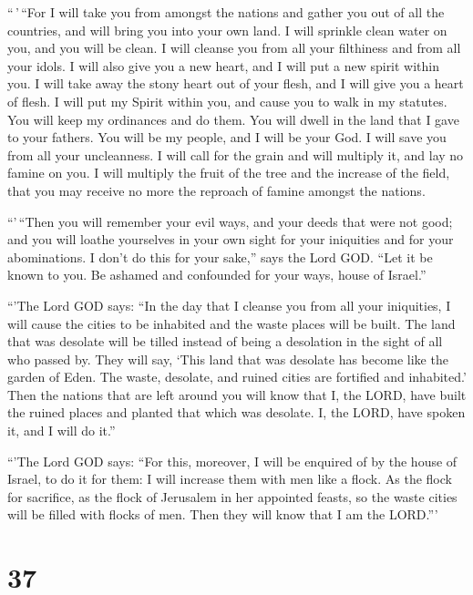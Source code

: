  ``\,'\,``For I will take you from amongst the nations and
gather you out of all the countries, and will bring you into your own
land.  I will sprinkle clean water on you, and you will be
clean. I will cleanse you from all your filthiness and from all your
idols.  I will also give you a new heart, and I will put a
new spirit within you. I will take away the stony heart out of your
flesh, and I will give you a heart of flesh.  I will put my
Spirit within you, and cause you to walk in my statutes. You will keep
my ordinances and do them.  You will dwell in the land that
I gave to your fathers. You will be my people, and I will be your God.
 I will save you from all your uncleanness. I will call for
the grain and will multiply it, and lay no famine on you. 
I will multiply the fruit of the tree and the increase of the field,
that you may receive no more the reproach of famine amongst the nations.

 ``'\,``Then you will remember your evil ways, and your
deeds that were not good; and you will loathe yourselves in your own
sight for your iniquities and for your abominations.  I
don't do this for your sake,'' says the Lord GOD. ``Let it be known to
you. Be ashamed and confounded for your ways, house of Israel.''

 ``'The Lord GOD says: ``In the day that I cleanse you from
all your iniquities, I will cause the cities to be inhabited and the
waste places will be built.  The land that was desolate
will be tilled instead of being a desolation in the sight of all who
passed by.  They will say, `This land that was desolate has
become like the garden of Eden. The waste, desolate, and ruined cities
are fortified and inhabited.'  Then the nations that are
left around you will know that I, the LORD, have built the ruined places
and planted that which was desolate. I, the LORD, have spoken it, and I
will do it.''

 ``'The Lord GOD says: ``For this, moreover, I will be
enquired of by the house of Israel, to do it for them: I will increase
them with men like a flock.  As the flock for sacrifice, as
the flock of Jerusalem in her appointed feasts, so the waste cities will
be filled with flocks of men. Then they will know that I am the LORD.'''

\hypertarget{section-35}{%
\section{37}\label{section-35}}


